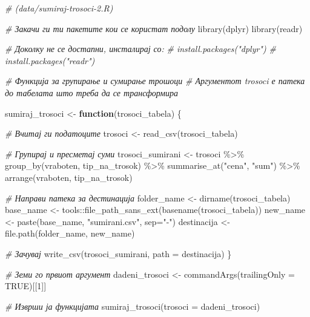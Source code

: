 \documentclass[
]{book}
\newenvironment{Shaded}{\begin{snugshade}}{\end{snugshade}}
\newcommand{\AttributeTok}[1]{\textcolor[rgb]{0.77,0.63,0.00}{#1}}
\newcommand{\CommentTok}[1]{\textcolor[rgb]{0.56,0.35,0.01}{\textit{#1}}}
\newcommand{\ConstantTok}[1]{\textcolor[rgb]{0.00,0.00,0.00}{#1}}
\newcommand{\ControlFlowTok}[1]{\textcolor[rgb]{0.13,0.29,0.53}{\textbf{#1}}}
\newcommand{\DecValTok}[1]{\textcolor[rgb]{0.00,0.00,0.81}{#1}}
\newcommand{\FunctionTok}[1]{\textcolor[rgb]{0.00,0.00,0.00}{#1}}
\newcommand{\NormalTok}[1]{#1}
\newcommand{\OtherTok}[1]{\textcolor[rgb]{0.56,0.35,0.01}{#1}}
\newcommand{\SpecialCharTok}[1]{\textcolor[rgb]{0.00,0.00,0.00}{#1}}
\newcommand{\StringTok}[1]{\textcolor[rgb]{0.31,0.60,0.02}{#1}}
\begin{document}
\begin{Shaded}
\begin{Highlighting}[]
\CommentTok{\# (data/sumiraj{-}trosoci{-}2.R)}

\CommentTok{\# Закачи ги ти пакетите кои се користат подолу }
\FunctionTok{library}\NormalTok{(dplyr)}
\FunctionTok{library}\NormalTok{(readr)}

\CommentTok{\# Доколку не се достапни, инсталирај со:}
\CommentTok{\# install.packages("dplyr")}
\CommentTok{\# install.packages("readr")}

\CommentTok{\# Функција за групирање и сумирање трошоци}
\CommentTok{\# Аргументот \textasciigrave{}trosoci\textasciigrave{} е патека до табелата што треба да се трансформира}

\NormalTok{sumiraj\_trosoci }\OtherTok{\textless{}{-}} \ControlFlowTok{function}\NormalTok{(trosoci\_tabela) \{}
  
  \CommentTok{\# Вчитај ги податоците}
\NormalTok{  trosoci }\OtherTok{\textless{}{-}} \FunctionTok{read\_csv}\NormalTok{(trosoci\_tabela)}
  
  \CommentTok{\# Групирај и пресметај суми}
\NormalTok{  trosoci\_sumirani }\OtherTok{\textless{}{-}}\NormalTok{ trosoci }\SpecialCharTok{\%\textgreater{}\%}
    \FunctionTok{group\_by}\NormalTok{(vraboten, tip\_na\_trosok) }\SpecialCharTok{\%\textgreater{}\%}
    \FunctionTok{summarise\_at}\NormalTok{(}\StringTok{"cena"}\NormalTok{, }\StringTok{"sum"}\NormalTok{) }\SpecialCharTok{\%\textgreater{}\%} 
  \FunctionTok{arrange}\NormalTok{(vraboten, tip\_na\_trosok)}
  
  \CommentTok{\# Направи патека за дестинација}
\NormalTok{  folder\_name }\OtherTok{\textless{}{-}} \FunctionTok{dirname}\NormalTok{(trosoci\_tabela)}
\NormalTok{  base\_name }\OtherTok{\textless{}{-}}\NormalTok{ tools}\SpecialCharTok{::}\FunctionTok{file\_path\_sans\_ext}\NormalTok{(}\FunctionTok{basename}\NormalTok{(trosoci\_tabela))}
\NormalTok{  new\_name }\OtherTok{\textless{}{-}} \FunctionTok{paste}\NormalTok{(base\_name, }\StringTok{"sumirani.csv"}\NormalTok{, }\AttributeTok{sep=}\StringTok{"{-}"}\NormalTok{)}
\NormalTok{  destinacija }\OtherTok{\textless{}{-}} \FunctionTok{file.path}\NormalTok{(folder\_name, new\_name)}
  
  \CommentTok{\# Зачувај}
  \FunctionTok{write\_csv}\NormalTok{(trosoci\_sumirani, }\AttributeTok{path =}\NormalTok{ destinacija)}
\NormalTok{\}}

\CommentTok{\# Земи го првиот аргумент}
\NormalTok{dadeni\_trosoci }\OtherTok{\textless{}{-}} \FunctionTok{commandArgs}\NormalTok{(}\AttributeTok{trailingOnly =} \ConstantTok{TRUE}\NormalTok{)[[}\DecValTok{1}\NormalTok{]]}

\CommentTok{\# Изврши ја функцијата}
\FunctionTok{sumiraj\_trosoci}\NormalTok{(}\AttributeTok{trosoci =}\NormalTok{ dadeni\_trosoci)}
\end{Highlighting}
\end{Shaded}
\end{document}
